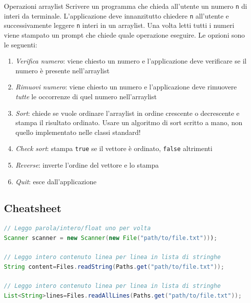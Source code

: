 \begin{esercizio}{Operazioni arraylist}
	Scrivere un programma che chieda all'utente un numero \verb|n| di interi da terminale. L'applicazione deve innanzitutto chiedere \verb|n| all'utente e successivamente leggere \verb|n| interi in un arraylist. Una volta letti tutti i numeri viene stampato un prompt che chiede quale operazione eseguire. Le opzioni sono le seguenti:
	\begin{enumerate}
		\item \textit{Verifica numero}: viene chiesto un numero e l'applicazione deve verificare se il numero è presente nell'arraylist
		\item \textit{Rimuovi numero}: viene chiesto un numero e l'applicazione deve rimuovere \textit{tutte} le occorrenze di quel numero nell'arraylist
		\item \textit{Sort}: chiede se vuole ordinare l'arraylist in ordine crescente o decrescente e stampa il risultato ordinato. Usare un algoritmo di sort scritto a mano, non quello implementato nelle classi standard!
		\item \textit{Check sort}: stampa \verb|true| se il vettore è ordinato, \verb|false| altrimenti
		\item \textit{Reverse}: inverte l'ordine del vettore e lo stampa
		\item \textit{Quit}: esce dall'applicazione
	\end{enumerate}
\end{esercizio}

\newpage
\subsection{Cheatsheet}
\footnotesize
{}
\begin{lstlisting}[language = java, frame = none, basicstyle=\ttfamily\footnotesize]
// Leggo parola/intero/float uno per volta
Scanner scanner = new Scanner(new File("path/to/file.txt")));

// Leggo intero contenuto linea per linea in lista di stringhe
String content=Files.readString(Paths.get("path/to/file.txt"));

// Leggo intero contenuto linea per linea in lista di stringhe
List<String>lines=Files.readAllLines(Paths.get("path/to/file.txt"));
\end{lstlisting}

